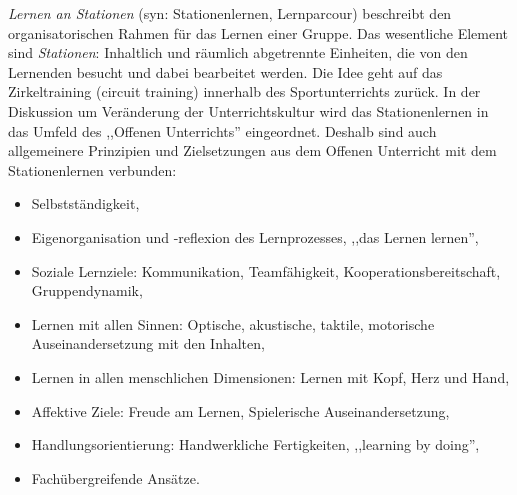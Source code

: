 \emph{Lernen an Stationen} (syn: Stationenlernen, Lernparcour) beschreibt den organisatorischen Rahmen f\"{u}r
das Lernen einer Gruppe. Das wesentliche Element sind \emph{Stationen}: Inhaltlich und r\"{a}umlich abgetrennte Einheiten, die von den Lernenden besucht und dabei bearbeitet werden.
\mip
Die Idee geht auf das Zirkeltraining (circuit training) innerhalb des Sportunterrichts zur\"{u}ck.
In der Diskussion um Ver\"{a}nderung der Unterrichtskultur wird das Stationenlernen
in das Umfeld des ,,Offenen Unterrichts'' eingeordnet.
\mip
Deshalb sind auch allgemeinere Prinzipien und Zielsetzungen aus dem Offenen Unterricht
mit dem Stationenlernen verbunden:
\begin{itemize}
\item Selbstst\"{a}ndigkeit,
\item Eigenorganisation und -reflexion des Lernprozesses, ,,das Lernen lernen'',
\item Soziale Lernziele: Kommunikation, Teamf\"{a}higkeit, Kooperationsbereitschaft, Gruppendynamik,
\item Lernen mit allen Sinnen: Optische, akustische, taktile, motorische Auseinandersetzung mit den Inhalten,
\item Lernen in allen menschlichen Dimensionen: Lernen mit Kopf, Herz und Hand,
\item Affektive Ziele: Freude am Lernen, Spielerische Auseinandersetzung,
\item Handlungsorientierung: Handwerkliche Fertigkeiten, ,,learning by doing'',
\item Fach\"{u}bergreifende Ans\"{a}tze.
\end{itemize}

